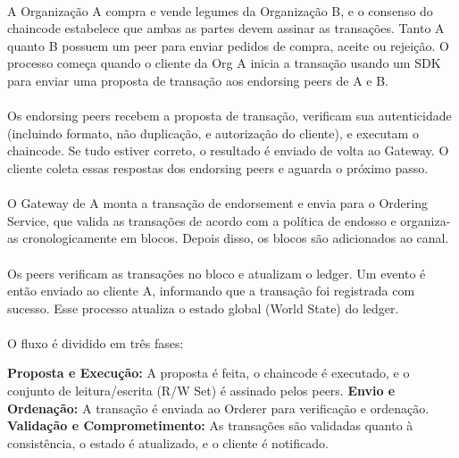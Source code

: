 \documentclass[letterpaper,11pt,leqno]{article}
\begin{document}
\paragraph{}
A Organização A compra e vende legumes da Organização B, e o consenso do
chaincode estabelece que ambas as partes devem assinar as transações. Tanto A
quanto B possuem um peer para enviar pedidos de compra, aceite ou rejeição. O
processo começa quando o cliente da Org A inicia a transação usando um SDK para
enviar uma proposta de transação aos endorsing peers de A e B.

\paragraph{}
Os endorsing peers recebem a proposta de transação, verificam sua autenticidade
(incluindo formato, não duplicação, e autorização do cliente), e executam o
chaincode. Se tudo estiver correto, o resultado é enviado de volta ao Gateway. O
cliente coleta essas respostas dos endorsing peers e aguarda o próximo passo.

\paragraph{}
O Gateway de A monta a transação de endorsement e envia para o Ordering Service,
que valida as transações de acordo com a política de endosso e organiza-as
cronologicamente em blocos. Depois disso, os blocos são adicionados ao canal.

\paragraph{}
Os peers verificam as transações no bloco e atualizam o ledger. Um evento é
então enviado ao cliente A, informando que a transação foi registrada com
sucesso. Esse processo atualiza o estado global (World State) do ledger.

\paragraph{}
O fluxo é dividido em três fases:

\textbf{Proposta e Execução:} A proposta é feita, o chaincode é executado, e o
conjunto de leitura/escrita (R/W Set) é assinado pelos peers.
\newline
\textbf{Envio e Ordenação:} A transação é enviada ao Orderer para verificação e ordenação.
\newline
\textbf{Validação e Comprometimento:} As transações são validadas quanto à
consistência, o estado é atualizado, e o cliente é notificado.
\end{document}
